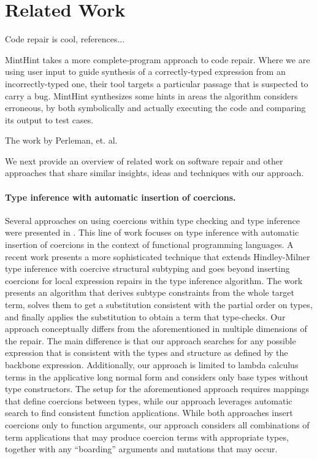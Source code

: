 \section{Related Work}
\label{sec:related}

Code repair is cool, references...

MintHint \citep{MintHint} takes a more complete-program approach to code repair. Where we are using user input to guide synthesis of a correctly-typed expression from an incorrectly-typed one, their tool targets a particular passage that is suspected to carry a bug. MintHint synthesizes some hints in areas the algorithm considers erroneous, by both symbolically and actually executing the code and comparing its output to test cases.

The work by Perleman, et. al. \cite{PerelmanGBG12}

We next provide an overview of related work on software repair and other approaches
that share similar insights, ideas and techniques with our approach.

\vspace{-0.5em}
\paragraph{{\bf Type inference with automatic insertion of coercions.}}
Several approaches on using coercions within type checking and type inference
were presented in \cite{Mitchell:1984:CTI:800017.800529,Luo:2008:CPT:1394781.1394785}.
This line of work focuses on type inference with automatic insertion of coercions in the
context of functional programming languages.
A recent work \cite{Traytel:2011:EHT:2183641.2183654} presents a more sophisticated technique that extends Hindley-Milner
type inference with coercive structural subtyping and goes beyond inserting coercions for
local expression repairs in the type inference algorithm.
The work presents an algorithm that derives subtype constraints from the whole target
term, solves them to get a substitution consistent with the partial order on types, and
finally applies the substitution to obtain a term that type-checks.
Our approach conceptually differs from the aforementioned in multiple dimensions of the
repair.
The main difference is that our approach searches for any possible expression that is
consistent with the types and structure as defined by the backbone expression.
Additionally, our approach is limited to lambda calculus terms in the
applicative long normal form and considers only base types without type
constructors.
The setup for the aforementioned approach requires mappings that define
coercions between types, while our approach leverages automatic search to find
consistent function applications.
While both approaches insert coercions only to function arguments, our approach
considers all combinations of term applications that may produce coercion terms with
appropriate types, together with any ``boarding'' arguments and mutations that may occur.

